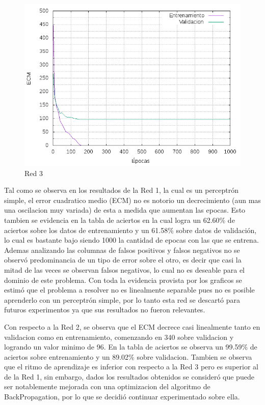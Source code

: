 \begin{figure}[h!]
  \includegraphics[width=125mm]{imagenes/ej1/ex_1-1_red_11-21-1_errors.png}
  \caption{Red 3}
\end{figure}


 Tal como se observa en los resultados de la Red 1, la cual es un perceptrón simple, el error cuadratico medio (ECM) no es notorio un decrecimiento (aun mas una oscilacion
 muy variada) de esta a medida que aumentan las epocas.
 Esto tambien se evidencia en la tabla de aciertos en la cual logra un 62.60\% de aciertos sobre los datos de entrenamiento y un 61.58\% sobre datos de validación,
 lo cual es bastante bajo siendo 1000 la cantidad de epocas con las que se entrena. Ademas analizando las columnas de falsos positivos y falsos negativos no se observó
 predominancia de un tipo de error sobre el otro, es decir que casi la mitad de las veces se observan falsos negativos, lo cual no es deseable para el dominio de este problema.
 Con toda la evidencia provista por los graficos se estimó que el problema a resolver no es linealmente separable pues no es posible
 aprenderlo con un perceptrón simple, por lo tanto esta red se descartó para futuros experimentos ya que sus resultados no fueron relevantes.

 Con respecto a la Red 2, se observa que el ECM decrece casi linealmente tanto en validacion como en entrenamiento, comenzando en 340 sobre validacion y
 logrando un valor minimo de 96. En la tabla de aciertos se observa un 99.59\% de aciertos sobre entrenamiento y un 89.02\% sobre validacion. Tambien se observa
 que el ritmo de aprendizaje es inferior con respecto a la Red 3 pero es superior al de la Red 1, sin embargo, dados los resultados obtenidos se consideró
 que puede ser notablemente mejorada con una optimizacion del algoritmo de BackPropagation, por lo que se decidió continuar experimentado sobre ella.

